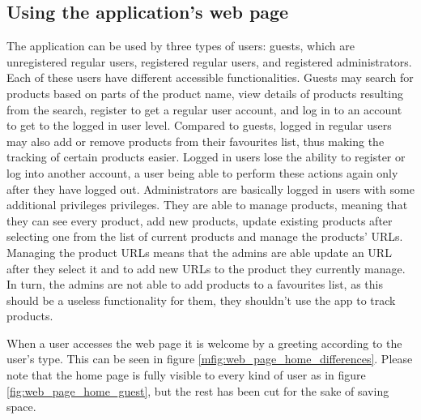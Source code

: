 \documentclass[12pt,a4paper,twoside]{report}
\begin{document}
\subsection{Using the application's web page}

The application can be used by three types of users: guests, which are unregistered regular users, registered regular users, and registered administrators. Each of these users have different accessible functionalities. Guests may search for products based on parts of the product name, view details of products resulting from the search, register to get a regular user account, and log in to an account to get to the logged in user level. Compared to guests, logged in regular users may also add or remove products from their favourites list, thus making the tracking of certain products easier. Logged in users lose the ability to register or log into another account, a user being able to perform these actions again only after they have logged out. Administrators are basically logged in users with some additional privileges privileges. They are able to manage products, meaning that they can see every product, add new products, update existing products after selecting one from the list of current products and manage the products' URLs. Managing the product URLs means that the admins are able update an URL after they select it and to add new URLs to the product they currently manage. In turn, the admins are not able to add products to a favourites list, as this should be a useless functionality for them, they shouldn't use the app to track products.

When a user accesses the web page it is welcome by a greeting according to the user's type. This can be seen in figure \ref{mfig:web_page_home_differences}. Please note that the home page is fully visible to every kind of user as in figure \ref{fig:web_page_home_guest}, but the rest has been cut for the sake of saving space.
\end{document}
